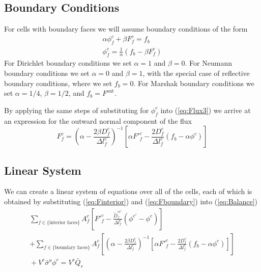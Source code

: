 \documentclass{article}
\newcommand{\bfunc}{\ensuremath{f_{b}}}
\begin{document}
\subsection{Boundary Conditions}

For cells with boundary faces we will assume boundary conditions of the
form
\begin{gather}
	\alpha \phi^{c}_{f} + \beta F^{c}_{f} = \bfunc
  \\
	\phi^{c}_{f} = \frac{1}{\alpha} \left( \bfunc - \beta F^{c}_{f} \right)
\label{eq:phicf_bc}
\end{gather}
For Dirichlet boundary conditions we set $\alpha=1$ and $\beta=0$.
For Neumann boundary conditions we set $\alpha=0$ and $\beta=1$,
 with the special
case of reflective boundary conditions, where we set $\bfunc = 0$.
For Marshak boundary conditions we set $\alpha=1/4$, $\beta=1/2$, and
$\bfunc = F^{\text{out}}$.

By applying the same steps of substituting for $\phi^{c}_{f}$ into
(\ref{eq:Flux3})
we arrive at an expression for the outward normal component of the flux
\begin{equation}
	F^{c}_{f} = \left( \alpha - \frac{2 \beta D^{c}_{f}}{\Delta l^{c}_{f}}
		    \right)^{-1}
		    \left[ \alpha {F'}^{c}_{f} - \frac{2 D^{c}_{f}}{\Delta l^{c}_{f}}
						\left(\bfunc - \alpha \phi^{c}\right)
		    \right]
\label{eq:Fboundary}
\end{equation}

\subsection{Linear System}

We can create a linear system of equations over all of the cells, each of 
which is obtained by substituting (\ref{eq:Finterior}) and (\ref{eq:Fboundary})
into (\ref{eq:Balance})
\begin{multline}
	\sum_{f \in \{\text{interior faces}\}}
	A^{c}_{f} \left[
		{F'}^{c}_{f} -  \frac{\tilde{D}^{cc'}_{f}}{\Delta l^{c}_{f}}
				\left( \phi^{c'} - \phi^{c} \right)
        \right]
   \\
   +
	\sum_{f \in \{\text{boundary faces}\}}
	A^{c}_{f} \left[
		    \left( \alpha - \frac{2 \beta D^{c}_{f}}{\Delta l^{c}_{f}}
		    \right)^{-1}
		    \left[ \alpha {F'}^{c}_{f} - \frac{2 D^{c}_{f}}{\Delta l^{c}_{f}}
						\left(\bfunc - \alpha \phi^{c}\right)
		    \right]
	\right]
   \\
   \mbox{} +
	 V^{c} \bar{\sigma}^{a} \phi^{c}
		= V^{c} \bar{Q}_{r}
\end{multline}
\end{document}
